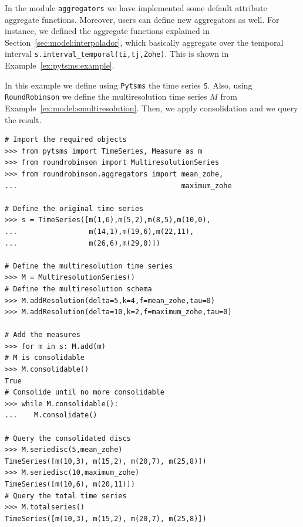 In the module \texttt{aggregators} we have implemented some default
attribute aggregate functions. Moreover, users can define new
aggregators as well. For instance, we defined the \zohe{} aggregate
functions explained in Section~\ref{sec:model:interpolador}, which
basically aggregate over the temporal interval
\verb|s.interval_temporal(ti,tj,Zohe)|. This is shown in
Example~\ref{ex:pytsms:example}.


\begin{example}
  In this example we define using \texttt{Pytsms} the time series
  \texttt{S}. Also, using \texttt{RoundRobinson} we define the
  multiresolution time series $M$ from
  Example~\ref{ex:model:smultiresolution}. Then, we apply
  consolidation and we query the result.

{\small
\begin{verbatim}
# Import the required objects
>>> from pytsms import TimeSeries, Measure as m
>>> from roundrobinson import MultiresolutionSeries
>>> from roundrobinson.aggregators import mean_zohe,
...                                       maximum_zohe

# Define the original time series
>>> s = TimeSeries([m(1,6),m(5,2),m(8,5),m(10,0),
...                 m(14,1),m(19,6),m(22,11),
...                 m(26,6),m(29,0)])

# Define the multiresolution time series
>>> M = MultiresolutionSeries()
# Define the multiresolution schema
>>> M.addResolution(delta=5,k=4,f=mean_zohe,tau=0)
>>> M.addResolution(delta=10,k=2,f=maximum_zohe,tau=0)

# Add the measures
>>> for m in s: M.add(m)
# M is consolidable
>>> M.consolidable()
True
# Consolide until no more consolidable
>>> while M.consolidable():
...    M.consolidate()

# Query the consolidated discs 
>>> M.seriedisc(5,mean_zohe)
TimeSeries([m(10,3), m(15,2), m(20,7), m(25,8)])
>>> M.seriedisc(10,maximum_zohe)
TimeSeries([m(10,6), m(20,11)])
# Query the total time series
>>> M.totalseries()
TimeSeries([m(10,3), m(15,2), m(20,7), m(25,8)])
\end{verbatim}
}
\end{example}





